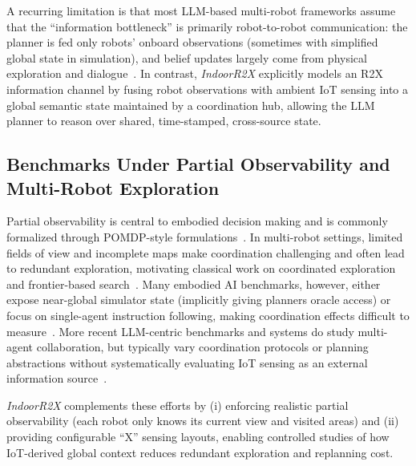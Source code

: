 A recurring limitation is that most LLM-based multi-robot frameworks assume that the ``information bottleneck'' is primarily robot-to-robot communication: the planner is fed only robots’ onboard observations (sometimes with simplified global state in simulation), and belief updates largely come from physical exploration and dialogue~\cite{ahn2024vader, ling2025elhplan, nayak2024long}. In contrast, \textit{IndoorR2X} explicitly models an R2X information channel by fusing robot observations with ambient IoT sensing into a global semantic state maintained by a coordination hub, allowing the LLM planner to reason over shared, time-stamped, cross-source state.

\subsection{Benchmarks Under Partial Observability and Multi-Robot Exploration}
Partial observability is central to embodied decision making and is commonly formalized through POMDP-style formulations~\cite{kaelbling1998planning}. In multi-robot settings, limited fields of view and incomplete maps make coordination challenging and often lead to redundant exploration, motivating classical work on coordinated exploration and frontier-based search~\cite{burgard2005coordinated, yamauchi1998frontier}.
Many embodied AI benchmarks, however, either expose near-global simulator state (implicitly giving planners oracle access) or focus on single-agent instruction following, making coordination effects difficult to measure~\cite{kant2022housekeep}. More recent LLM-centric benchmarks and systems do study multi-agent collaboration, but typically vary coordination protocols or planning abstractions without systematically evaluating IoT sensing as an external information source~\cite{huang2025compositional, lim2025dynamic, liu2024heterogeneous}.

\textit{IndoorR2X} complements these efforts by (i) enforcing realistic partial observability (each robot only knows its current view and visited areas) and (ii) providing configurable ``X'' sensing layouts, enabling controlled studies of how IoT-derived global context reduces redundant exploration and replanning cost.



